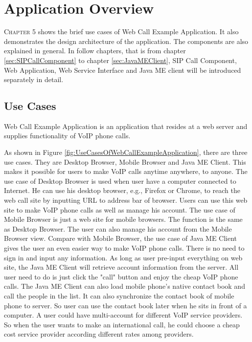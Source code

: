 
\chapter{Application Overview}
\label{sec:ApplicationOverview}

\lettrine[lines=3]{C}{hapter} 5 shows the brief use cases of \textsf{Web Call Example Application}. It also demonstrates the design architecture of the application. The components are also explained in general. In follow chapters, that is from chapter \ref{sec:SIPCallComponent} to chapter \ref{sec:JavaMEClient}, \textsf{SIP Call Component}, \textsf{Web Application}, \textsf{Web Service Interface} and \textsf{Java ME client} will be introduced separately in detail.

\section{Use Cases}
\label{sec:ApplicationOverview:UseCases}

Web Call Example Application is an application that resides at a web server and supplies functionality of VoIP phone calls.

\begin{sidewaysfigure}
\centering
{}
\caption{Use Cases of Web Call Example Application}
\label{fig:UseCasesOfWebCallExampleApplication}
\end{sidewaysfigure}

As shown in Figure \ref{fig:UseCasesOfWebCallExampleApplication}, there are three use cases. They are Desktop Browser, Mobile Browser and Java ME Client. This makes it possible for users to make VoIP calls anytime anywhere, to anyone. The use case of Desktop Browser is used when user have a computer connected to Internet. He can use his desktop browser, e.g., Firefox or Chrome, to reach the web call site by inputting URL to address bar of browser. Users can use this web site to make VoIP phone calls as well as manage his account. The use case of Mobile Browser is just a web site for mobile browsers. The function is the same as Desktop Browser. The user can also manage his account from the Mobile Browser view. Compare with Mobile Browser, the use case of Java ME Client gives the user an even easier way to make VoIP phone calls. There is no need to sign in and input any information. As long as user pre-input everything on web site, the Java ME Client will retrieve account information from the server. All user need to do is just click the "call" button and enjoy the cheap VoIP phone calls. The Java ME Client can also load mobile phone's native contact book and call the people in the list. It can also synchronize the contact book of mobile phone to server. So user can use the contact book later when he sits in front of a computer. A user could have multi-account for different VoIP service providers. So when the user wants to make an international call, he could choose a cheap cost service provider according different rates among providers.

